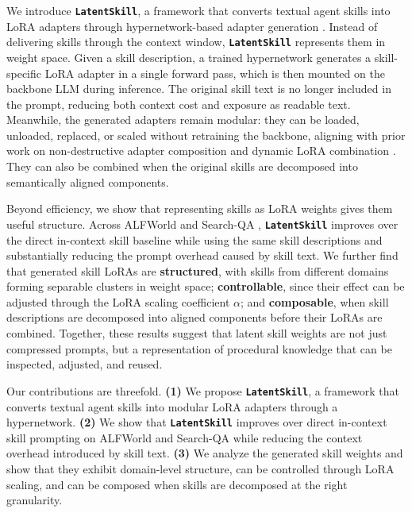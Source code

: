 \documentclass{llmxive}
\providecommand{\textttt}[1]{\texttt{#1}}
\providecommand{\method}{\textbf{\textttt{LatentSkill}}}
\begin{document}
We introduce \textbf{\method{}}, a framework that converts textual agent skills into LoRA adapters through hypernetwork-based adapter generation \citep{Ha2017Hypernetwork, Hu2022LoRA, Liu2026SHINE}.
Instead of delivering skills through the context window, \method{} represents them in weight space.
Given a skill description, a trained hypernetwork generates a skill-specific LoRA adapter in a single forward pass, which is then mounted on the backbone LLM during inference.
The original skill text is no longer included in the prompt, reducing both context cost and exposure as readable text.
Meanwhile, the generated adapters remain modular: they can be loaded, unloaded, replaced, or scaled without retraining the backbone, aligning with prior work on non-destructive adapter composition and dynamic LoRA combination \citep{Pfeiffer2021AdapterFusion, Huang2024LoraHub}.
They can also be combined when the original skills are decomposed into semantically aligned components.

Beyond efficiency, we show that representing skills as LoRA weights gives them useful structure.
Across ALFWorld \citep{Shridhar2021ALFWorld} and Search-QA \citep{Jin2025SearchR1}, \method{} improves over the direct in-context skill baseline while using the same skill descriptions and substantially reducing the prompt overhead caused by skill text.
We further find that generated skill LoRAs are \textbf{structured}, with skills from different domains forming separable clusters in weight space; \textbf{controllable}, since their effect can be adjusted through the LoRA scaling coefficient $\alpha$; and \textbf{composable}, when skill descriptions are decomposed into aligned components before their LoRAs are combined.
Together, these results suggest that latent skill weights are not just compressed prompts, but a representation of procedural knowledge that can be inspected, adjusted, and reused.

Our contributions are threefold. 
\textbf{(1)} We propose \method{}, a framework that converts textual agent skills into modular LoRA adapters through a hypernetwork. 
\textbf{(2)} We show that \method{} improves over direct in-context skill prompting on ALFWorld and Search-QA while reducing the context overhead introduced by skill text. 
\textbf{(3)} We analyze the generated skill weights and show that they exhibit domain-level structure, can be controlled through LoRA scaling, and can be composed when skills are decomposed at the right granularity.
\end{document}
